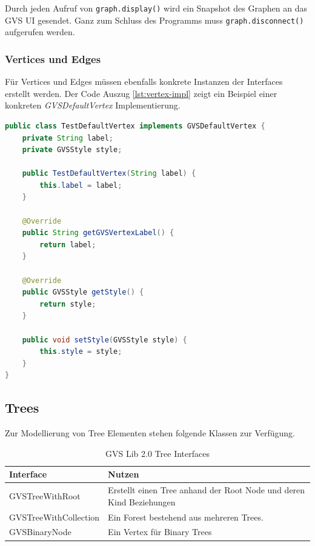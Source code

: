 \documentclass[11pt,a4paper,english,oneside]{book}
\numberwithin{equation}{chapter}
\begin{document}
	\noindent
	Durch jeden Aufruf von \lstinline{graph.display()} wird ein Snapshot des Graphen an das GVS UI gesendet. Ganz zum Schluss des Programms muss \lstinline{graph.disconnect()} aufgerufen werden.
	
	\subsubsection{Vertices und Edges}
	Für Vertices und Edges müssen ebenfalls konkrete Instanzen der Interfaces erstellt werden. Der Code Auszug \ref{lst:vertex-impl} zeigt ein Beispiel einer konkreten \textit{GVSDefaultVertex} Implementierung.
	
\begin{lstlisting}[language=java, frame=single, caption={DefaultVertex Implementierung}, label={lst:vertex-impl}]
public class TestDefaultVertex implements GVSDefaultVertex {
	private String label;
	private GVSStyle style;
	
	public TestDefaultVertex(String label) {
		this.label = label;
	}
	
	@Override
	public String getGVSVertexLabel() {
		return label;
	}
	
	@Override
	public GVSStyle getStyle() {
		return style;
	}
	
	public void setStyle(GVSStyle style) {
		this.style = style;
	}
}
\end{lstlisting}

	\clearpage
	
	\subsection{Trees}
	Zur Modellierung von Tree Elementen stehen folgende Klassen zur Verfügung.
	
	\begin{table}[h!]
		\centering
		\begin{tabularx}{\linewidth}{l X}
			\toprule 
			Interface & Nutzen \\
			\midrule
			GVSTreeWithRoot & Erstellt einen Tree anhand der Root Node und deren Kind Beziehungen \\
			GVSTreeWithCollection & Ein Forest bestehend aus mehreren Trees.  \\
			GVSBinaryNode & Ein Vertex für Binary Trees \\
			\bottomrule 
		\end{tabularx} 
		\caption{GVS Lib 2.0 Tree Interfaces} 
		\label{tbl:tree-interfaces}
	\end{table}
	
\end{document}

